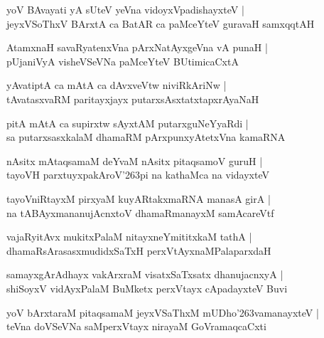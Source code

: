 \documentclass[twoside,12pt,openright]{book}
\def\S{\char'263}
\newcounter{shloka}[chapter]
\begin{document}
\begin{shloka}
yoV BAvayati yA sUteV yeVna vidoyxVpadishayxteV |\\
jeyxVSoThxV BArxtA ca BatAR ca paMceYteV guravaH samxqqtAH 
\end{shloka}

\begin{shloka}
AtamxnaH savaRyatenxVna pArxNatAyxgeVna vA punaH |\\
pUjaniVyA visheVSeVNa paMceYteV BUtimicaCxtA
\end{shloka}

\begin{shloka}
yAvatiptA ca mAtA ca dAvxveVtw niviRkAriNw |\\
tAvatasxvaRM paritayxjayx putarxsAsxtatxtapxrAyaNaH
\end{shloka}

\begin{shloka}
pitA mAtA ca supirxtw sAyxtAM  putarxguNeYyaRdi |\\
sa putarxsasxkalaM dhamaRM pArxpunxyAtetxVna kamaRNA 
\end{shloka}

\begin{shloka}
nAsitx mAtaqsamaM deYvaM nAsitx pitaqsamoV guruH |\\
tayoVH parxtuyxpakAroV\S pi na kathaMca na vidayxteV
\end{shloka}

\begin{shloka}
tayoVniRtayxM pirxyaM kuyARtakxmaRNA manasA girA |\\
na tABAyxmananujAcnxtoV dhamaRmanayxM samAcareVtf
\end{shloka}

\begin{shloka}
vajaRyitAvx mukitxPalaM nitayxneYmititxkaM tathA |\\
dhamaRsArasasxmudidxSaTxH perxVtAyxnaMPalaparxdaH 
\end{shloka}

\begin{shloka}
samayxgArAdhayx vakArxraM visatxSaTxsatx dhanujacnxyA |\\
shiSoyxV vidAyxPalaM BuMketx perxVtayx cApadayxteV Buvi
\end{shloka}

\begin{shloka}
yoV bArxtaraM pitaqsamaM jeyxVSaThxM mUDho\S vamanayxteV |\\
teVna doVSeVNa saMperxVtayx nirayaM GoVramaqcaCxti 
\end{shloka}
\end{document}
